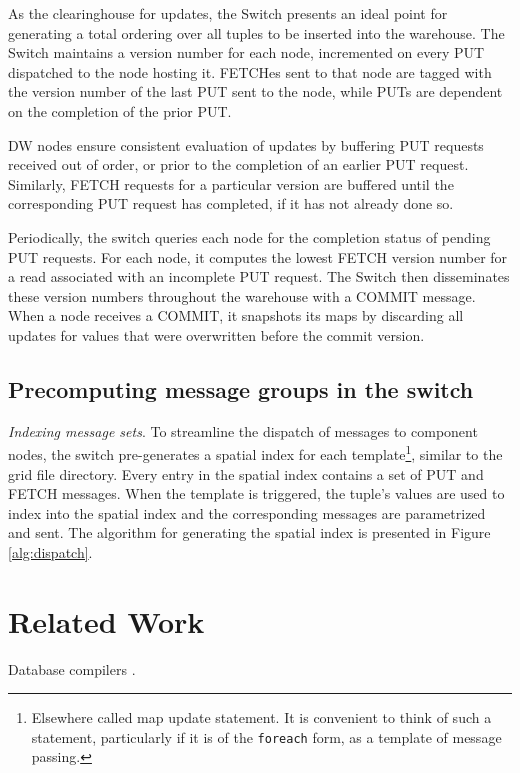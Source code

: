 As the clearinghouse for updates, the Switch presents an ideal point for generating a total ordering over all tuples to be inserted into the warehouse.  The Switch maintains a version number for each node, incremented on every PUT dispatched to the node hosting it.  FETCHes sent to that node are tagged with the version number of the last PUT sent to the node, while PUTs are dependent on the completion of the prior PUT.

DW nodes ensure consistent evaluation of updates by buffering PUT requests received out of order, or prior to the completion of an earlier PUT request.  Similarly, FETCH requests for a particular version are buffered until the corresponding PUT request has completed, if it has not already done so.

Periodically, the switch queries each node for the completion status of pending PUT requests.  For each node, it computes the lowest FETCH version number for a read associated with an incomplete PUT request.  The Switch then disseminates these version numbers throughout the warehouse with a COMMIT message.  When a node receives a COMMIT, it snapshots its maps by discarding all updates for values that were overwritten before the commit version.


\subsection{Precomputing message groups in the switch}

{\em Indexing message sets}.
To streamline the dispatch of messages to component nodes, the switch pre-generates a spatial index for each template\footnote{Elsewhere called map update statement. It is convenient to think of such a statement, particularly if it is of the {\tt foreach} form, as a template of message passing.}, similar to the grid file directory.  Every entry in the spatial index contains a set of PUT and FETCH messages.  When the template is triggered, the tuple's values are used to index into the spatial index and the corresponding messages are parametrized and sent.  The algorithm for generating the spatial index is presented in Figure \ref{alg:dispatch}.




\section{Related Work}
\label{sec:relatedwork}


Database compilers \cite{DBLP:conf/pods/Batory88,DBLP:journals/jiis/BatoryT97}.

